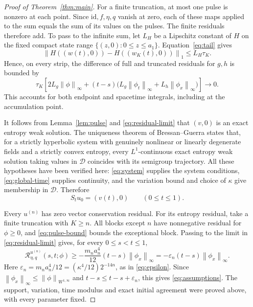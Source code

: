 \documentclass[11pt]{article}
\newcommand{\Res}{\mathcal R}
\newcommand{\norm}[1]{\left\|#1\right\|}
\begin{document}
\begin{proof}[Proof of Theorem~\ref{thm:main}]
For a finite truncation, at most one pulse is nonzero at each point. Since $\mathrm{id},f,\eta,q$ vanish at zero, each of these maps applied to the sum equals the sum of its values on the pulses. The finite residuals therefore add. To pass to the infinite sum, let $L_H$ be a Lipschitz constant of $H$ on the fixed compact state range $\{(z,0):0\le z\le a_1\}$. Equation~\eqref{eq:tail} gives
\[
 \norm{H((w(t),0))-H((w_K(t),0))}_1\le L_H\tau_K.
\]
Hence, on every strip, the difference of full and truncated residuals for $g,h$ is bounded by
\begin{equation}\label{eq:residual-limit}
 \tau_K\left[2L_g\norm{\phi}_\infty
 +(t-s)\bigl(L_g\norm{\phi_t}_\infty
             +L_h\norm{\phi_x}_\infty\bigr)\right]\longrightarrow0.
\end{equation}
This accounts for both endpoint and spacetime integrals, including at the accumulation point.

It follows from Lemma~\ref{lem:pulse} and \eqref{eq:residual-limit} that $(v,0)$ is an exact entropy weak solution. The uniqueness theorem of Bressan--Guerra \cite[Theorem~1.1]{BG} states that, for a strictly hyperbolic system with genuinely nonlinear or linearly degenerate fields and a strictly convex entropy, every $L^1$-continuous exact entropy weak solution taking values in $\mathcal D$ coincides with its semigroup trajectory. All these hypotheses have been verified here: \eqref{eq:system} supplies the system conditions, \eqref{eq:global-time} supplies continuity, and the variation bound and choice of $\kappa$ give membership in $\mathcal D$. Therefore
\begin{equation}\label{eq:identification}
 S_tu_0=(v(t),0)\qquad(0\le t\le1).
\end{equation}

Every $u^{(n)}$ has zero vector conservation residual. For its entropy residual, take a finite truncation with $K\ge n$. All blocks except $n$ have nonnegative residual for $\phi\ge0$, and \eqref{eq:pulse-bound} bounds the exceptional block. Passing to the limit in \eqref{eq:residual-limit} gives, for every $0\le s<t\le1$,
\[
 \Res^{u^{(n)}}_{\eta,q}(s,t;\phi)
 \ge-\frac{m_na_n^4}{12}(t-s)\norm{\phi_x}_\infty
 =-\varepsilon_n(t-s)\norm{\phi_x}_\infty.
\]
Here $\varepsilon_n=m_na_n^4/12=(\kappa^4/12)2^{-14n}$, as in \eqref{eq:epsilon}. Since $\norm{\phi_x}_\infty\le\norm{\phi}_{W^{1,\infty}}$ and $t-s\le t-s+\varepsilon_n$, this gives \eqref{eq:assumptions}. The support, variation, time modulus and exact initial agreement were proved above, with every parameter fixed.


\end{proof}
\end{document}
